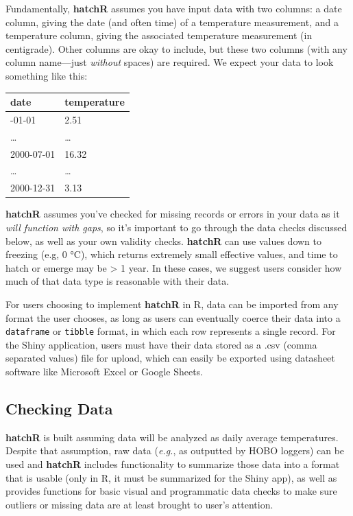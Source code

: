 \documentclass[10pt,a4paper,onecolumn]{article}
\begin{document}
Fundamentally, \textbf{hatchR} assumes you have input data with two
columns: a date column, giving the date (and often time) of a
temperature measurement, and a temperature column, giving the associated
temperature measurement (in centigrade). Other columns are okay to
include, but these two columns (with any column name---just
\emph{without} spaces) are required. We expect your data to look
something like this:

\begin{longtable}[]{@{}ll@{}}
\toprule\noalign{}
date & temperature \\
\midrule\noalign{}
\endhead
\bottomrule\noalign{}
\endlastfoot
2000-01-01 & 2.51 \\
\ldots{} & \ldots{} \\
2000-07-01 & 16.32 \\
\ldots{} & \ldots{} \\
2000-12-31 & 3.13 \\
\end{longtable}

\textbf{hatchR} assumes you've checked for missing records or errors in
your data as it \emph{will function with gaps}, so it's important to go
through the data checks discussed below, as well as your own validity
checks. \textbf{hatchR} can use values down to freezing (e.g, 0 °C),
which returns extremely small effective values, and time to hatch or
emerge may be \textgreater{} 1 year. In these cases, we suggest users
consider how much of that data type is reasonable with their data.

For users choosing to implement \textbf{hatchR} in R, data can be
imported from any format the user chooses, as long as users can
eventually coerce their data into a \texttt{dataframe} or
\texttt{tibble} format, in which each row represents a single record.
For the Shiny application, users must have their data stored as a .csv
(comma separated values) file for upload, which can easily be exported
using datasheet software like Microsoft Excel or Google Sheets.

\subsection{Checking Data}\label{checking-data}

\textbf{hatchR} is built assuming data will be analyzed as daily average
temperatures. Despite that assumption, raw data (\emph{e.g.}, as
outputted by HOBO loggers) can be used and \textbf{hatchR} includes
functionality to summarize those data into a format that is usable (only
in R, it must be summarized for the Shiny app), as well as provides
functions for basic visual and programmatic data checks to make sure
outliers or missing data are at least brought to user's attention.
\end{document}
